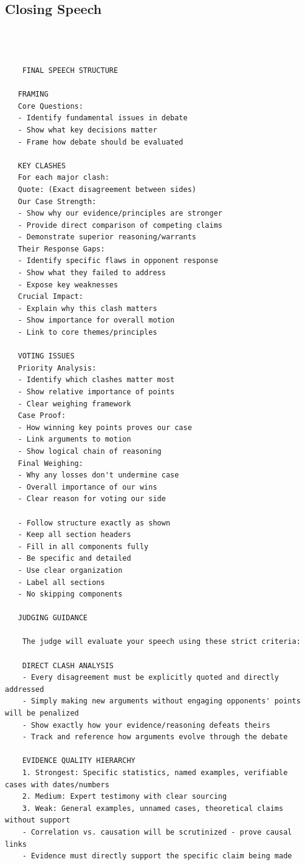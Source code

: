 \documentclass{article}
\begin{document}
  \subsection{Closing Speech}
  \begin{verbatim}



    FINAL SPEECH STRUCTURE

   FRAMING
   Core Questions:
   - Identify fundamental issues in debate
   - Show what key decisions matter
   - Frame how debate should be evaluated

   KEY CLASHES
   For each major clash:
   Quote: (Exact disagreement between sides)
   Our Case Strength:
   - Show why our evidence/principles are stronger
   - Provide direct comparison of competing claims
   - Demonstrate superior reasoning/warrants
   Their Response Gaps:
   - Identify specific flaws in opponent response
   - Show what they failed to address
   - Expose key weaknesses
   Crucial Impact:
   - Explain why this clash matters
   - Show importance for overall motion
   - Link to core themes/principles

   VOTING ISSUES
   Priority Analysis:
   - Identify which clashes matter most
   - Show relative importance of points
   - Clear weighing framework
   Case Proof:
   - How winning key points proves our case
   - Link arguments to motion
   - Show logical chain of reasoning
   Final Weighing:
   - Why any losses don't undermine case
   - Overall importance of our wins
   - Clear reason for voting our side

   - Follow structure exactly as shown
   - Keep all section headers
   - Fill in all components fully
   - Be specific and detailed
   - Use clear organization
   - Label all sections
   - No skipping components

   JUDGING GUIDANCE

    The judge will evaluate your speech using these strict criteria:

    DIRECT CLASH ANALYSIS
    - Every disagreement must be explicitly quoted and directly addressed
    - Simply making new arguments without engaging opponents' points will be penalized
    - Show exactly how your evidence/reasoning defeats theirs
    - Track and reference how arguments evolve through the debate

    EVIDENCE QUALITY HIERARCHY
    1. Strongest: Specific statistics, named examples, verifiable cases with dates/numbers
    2. Medium: Expert testimony with clear sourcing
    3. Weak: General examples, unnamed cases, theoretical claims without support
    - Correlation vs. causation will be scrutinized - prove causal links
    - Evidence must directly support the specific claim being made


\end{verbatim}
\end{document}
